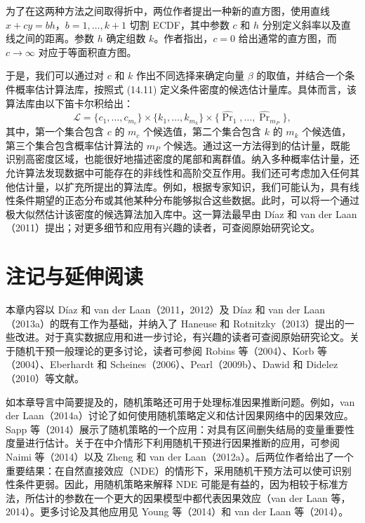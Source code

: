 为了在这两种方法之间取得折中，两位作者提出一种新的直方图，使用直线 $x+cy=bh$，$b=1,\ldots,k+1$ 切割 ECDF，其中参数 $c$ 和 $h$ 分别定义斜率以及直线之间的距离。参数 $h$ 确定组数 $k$。作者指出，$c=0$ 给出通常的直方图，而 $c\to\infty$ 对应于等面积直方图。

于是，我们可以通过对 $c$ 和 $k$ 作出不同选择来确定向量 $\beta$ 的取值，并结合一个条件概率估计算法库，按照式 (14.11) 定义条件密度的候选估计量库。具体而言，该算法库由以下笛卡尔积给出：
\[
 \mathcal L=\{c_1,\ldots,c_{m_c}\}\times\{k_1,\ldots,k_{m_k}\}
 \times\{\widehat{\Pr}_1,\ldots,\widehat{\Pr}_{m_P}\},
\]
其中，第一个集合包含 $c$ 的 $m_c$ 个候选值，第二个集合包含 $k$ 的 $m_k$ 个候选值，第三个集合包含概率估计算法的 $m_P$ 个候选。通过这一方法得到的估计量，既能识别高密度区域，也能很好地描述密度的尾部和离群值。纳入多种概率估计量，还允许算法发现数据中可能存在的非线性和高阶交互作用。我们还可考虑加入任何其他估计量，以扩充所提出的算法库。例如，根据专家知识，我们可能认为，具有线性条件期望的正态分布或其他某种分布能够拟合这些数据。此时，可以将一个通过极大似然估计该密度的候选算法加入库中。这一算法最早由 Díaz 和 van der Laan（2011）提出；对更多细节和应用有兴趣的读者，可查阅原始研究论文。

\section{注记与延伸阅读}

本章内容以 Díaz 和 van der Laan（2011，2012）及 Díaz 和 van der Laan（2013a）的既有工作为基础，并纳入了 Haneuse 和 Rotnitzky（2013）提出的一些改进。对于真实数据应用和进一步讨论，有兴趣的读者可查阅原始研究论文。关于随机干预一般理论的更多讨论，读者可参阅 Robins 等（2004）、Korb 等（2004）、Eberhardt 和 Scheines（2006）、Pearl（2009b）、Dawid 和 Didelez（2010）等文献。

如本章导言中简要提及的，随机策略还可用于处理标准因果推断问题。例如，van der Laan（2014a）讨论了如何使用随机策略定义和估计因果网络中的因果效应。Sapp 等（2014）展示了随机策略的一个应用：对具有区间删失结局的变量重要性度量进行估计。关于在中介情形下利用随机干预进行因果推断的应用，可参阅 Naimi 等（2014）以及 Zheng 和 van der Laan（2012a）。后两位作者给出了一个重要结果：在自然直接效应（NDE）的情形下，采用随机干预方法可以使可识别性条件更弱。因此，用随机策略来解释 NDE 可能是有益的，因为相较于标准方法，所估计的参数在一个更大的因果模型中都代表因果效应（van der Laan 等，2014）。更多讨论及其他应用见 Young 等（2014）和 van der Laan 等（2014）。
